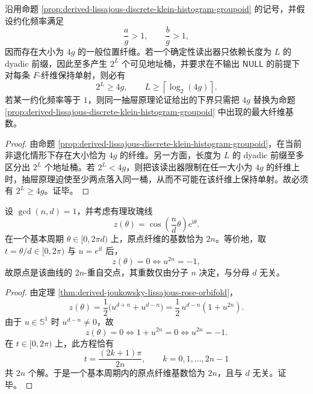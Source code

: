 \begin{corollary}\label{cor:derived-lissajous-dyadic-depth-lower-bound}
沿用命题 \ref{prop:derived-lissajous-discrete-klein-histogram-groupoid} 的记号，并假设约化频率满足
\[
\frac{a}{g}>1,
\qquad
\frac{b}{g}>1,
\]
因而存在大小为 \(4g\) 的一般位置纤维。若一个确定性读出器只依赖长度为 \(L\) 的 dyadic 前缀，因此至多产生 \(2^L\) 个可见地址桶，并要求在不输出 \(\mathsf{NULL}\) 的前提下对每条 \(F\)-纤维保持单射，则必有
\[
2^L\ge 4g,
\qquad
L\ge \left\lceil \log_2(4g)\right\rceil.
\]
若某一约化频率等于 \(1\)，则同一抽屉原理论证给出的下界只需把 \(4g\) 替换为命题 \ref{prop:derived-lissajous-discrete-klein-histogram-groupoid} 中出现的最大纤维基数。
\end{corollary}
\begin{proof}
由命题 \ref{prop:derived-lissajous-discrete-klein-histogram-groupoid}，在当前非退化情形下存在大小恰为 \(4g\) 的纤维。另一方面，长度为 \(L\) 的 dyadic 前缀至多区分出 \(2^L\) 个地址桶。若 \(2^L<4g\)，则把该读出器限制在任一大小为 \(4g\) 的纤维上时，抽屉原理迫使至少两点落入同一桶，从而不可能在该纤维上保持单射。故必须有 \(2^L\ge 4g\)。证毕。
\end{proof}

\begin{proposition}[有理玫瑰线原点纤维的分子刚性]\label{prop:derived-rational-rose-origin-fiber-numerator-rigidity}
设 \(\gcd(n,d)=1\)，并考虑有理玫瑰线
\[
z(\theta)=\cos\!\left(\frac{n}{d}\theta\right)e^{\mathrm i\theta}.
\]
在一个基本周期 \(\theta\in[0,2\pi d)\) 上，原点纤维的基数恰为 \(2n\)。等价地，取 \(t=\theta/d\in[0,2\pi)\) 与 \(u=e^{\mathrm i t}\) 后，
\[
z(\theta)=0
\iff
u^{2n}=-1,
\]
故原点是该曲线的 \(2n\)-重自交点，其重数仅由分子 \(n\) 决定，与分母 \(d\) 无关。
\end{proposition}
\begin{proof}
由定理 \ref{thm:derived-joukowsky-lissajous-rose-orbifold}，
\[
z(\theta)=\frac12\bigl(u^{d+n}+u^{d-n}\bigr)
=\frac12\,u^{d-n}(1+u^{2n}).
\]
由于 \(u\in\mathbb S^1\) 时 \(u^{d-n}\neq 0\)，故
\[
z(\theta)=0
\iff
1+u^{2n}=0
\iff
u^{2n}=-1.
\]
在 \(t\in[0,2\pi)\) 上，此方程恰有
\[
t=\frac{(2k+1)\pi}{2n},
\qquad
k=0,1,\dots,2n-1
\]
共 \(2n\) 个解。于是一个基本周期内的原点纤维基数恰为 \(2n\)，且与 \(d\) 无关。证毕。
\end{proof}

